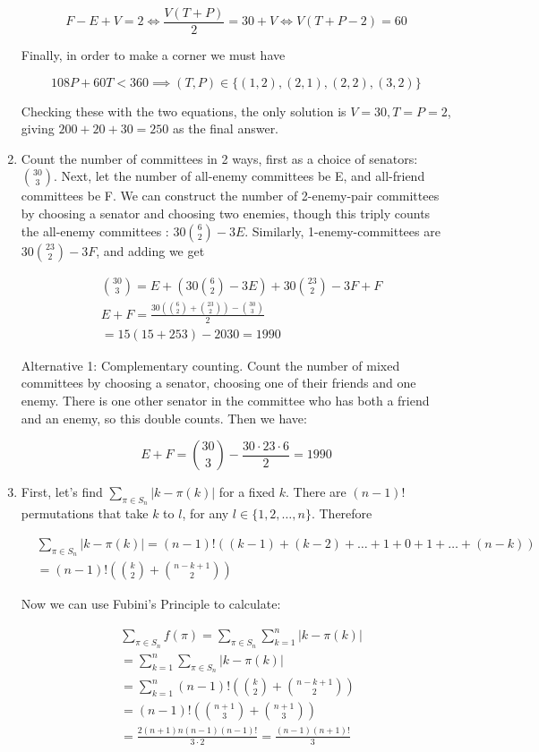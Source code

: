 \documentclass{book}
\numberwithin{equation}{section}
\begin{document}
\begin{enumerate}[label={7.\arabic*}]
$$F - E + V = 2 \iff \frac{V(T + P)}{2} = 30 + V \iff V(T + P - 2) = 60$$

Finally, in order to make a corner we must have

$$108P + 60T < 360 \implies (T, P) \in \{ (1, 2), (2, 1), (2, 2), (3, 2) \}$$

Checking these with the two equations, the only
solution is $V=30, T=P=2$, giving $200 + 20 + 30 = 250$ as the final answer.

\item
Count the number of committees in 2 ways, first as a choice of senators: ${30 \choose 3}$. Next, let the number
of all-enemy committees be E, and all-friend committees be F. We can construct the number of 2-enemy-pair
committees by choosing a senator and choosing two enemies, though this triply counts the all-enemy committees :
$30{6 \choose 2}-3E$. Similarly, 1-enemy-committees are $30{23 \choose 2} - 3F$, and adding we get

\begin{align*}
& {30 \choose 3} = E + (30{6 \choose 2}-3E) + 30{23 \choose 2} - 3F + F \\
& E + F = \frac{30\left( {6 \choose 2} + {23 \choose 2} \right) - {30 \choose 3}}{2} \\
& = 15(15 + 253) - 2030 = 1990
\end{align*}

Alternative 1: Complementary counting.
Count the number of mixed committees by choosing a senator, choosing one of their friends and one enemy.
There is one other senator in the committee who has both a friend and an enemy, so this double counts.
Then we have:

$$E + F = {30 \choose 3} - \frac{30\cdot 23 \cdot 6}{2} = 1990$$

\item
First, let's find $\sum_{\pi \in S_n} |k - \pi(k)|$ for a fixed $k$. There are $(n-1)!$ permutations that take $k$ to $l$,
for any $l \in \{ 1, 2, \ldots, n \}$. Therefore

\begin{align*}
& \sum_{\pi \in S_n} |k - \pi(k)| = (n-1)!\left( (k-1) + (k-2) + \ldots + 1 + 0 + 1 + \ldots + (n-k) \right) \\
& = (n-1)!\left( {k \choose 2} + {n - k  +1 \choose 2} \right)
\end{align*}

Now we can use Fubini's Principle to calculate:

\begin{align*}
& \sum_{\pi \in S_n} f(\pi) = \sum_{\pi \in S_n} \sum_{k=1}^n |k - \pi(k)| \\
& = \sum_{k=1}^n \sum_{\pi \in S_n} |k - \pi(k)| \\
& = \sum_{k=1}^n (n-1)!\left( {k \choose 2} + {n - k  +1 \choose 2} \right) \\
& = (n-1)! \left( {n+1 \choose 3} + {n+1 \choose 3} \right) \\
& = \frac{2(n+1)n(n-1)(n-1)!}{3\cdot 2} = \frac{(n-1)(n+1)!}{3}
\end{align*}


\end{enumerate}
\end{document}
